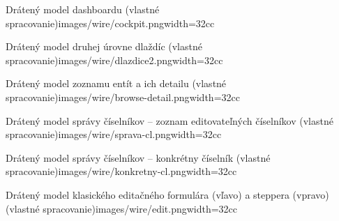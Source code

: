 {Drátený model dashboardu (vlastné spracovanie)}{images/wire/cockpit.png}{width=32cc}

{Drátený model druhej úrovne dlaždíc (vlastné spracovanie)}{images/wire/dlazdice2.png}{width=32cc}

{Drátený model zoznamu entít a ich detailu (vlastné spracovanie)}{images/wire/browse-detail.png}{width=32cc}

{Drátený model správy číselníkov -- zoznam editovateľných číselníkov (vlastné spracovanie)}{images/wire/sprava-cl.png}{width=32cc}

{Drátený model správy číselníkov -- konkrétny číselník (vlastné spracovanie)}{images/wire/konkretny-cl.png}{width=32cc}

{Drátený model klasického editačného formulára (vľavo) a steppera (vpravo) (vlastné spracovanie)}{images/wire/edit.png}{width=32cc}



\setupTABLE[frame=on]
\setupTABLE[row][first][background=color, backgroundcolor=lightgray, style=bold]
\setupTABLE[column][1][width=3cc]
\setupTABLE[column][2][width=15cc]
\setupTABLE[column][3][width=14cc]
\setupTABLE[r][each][align={middle,lohi}]


